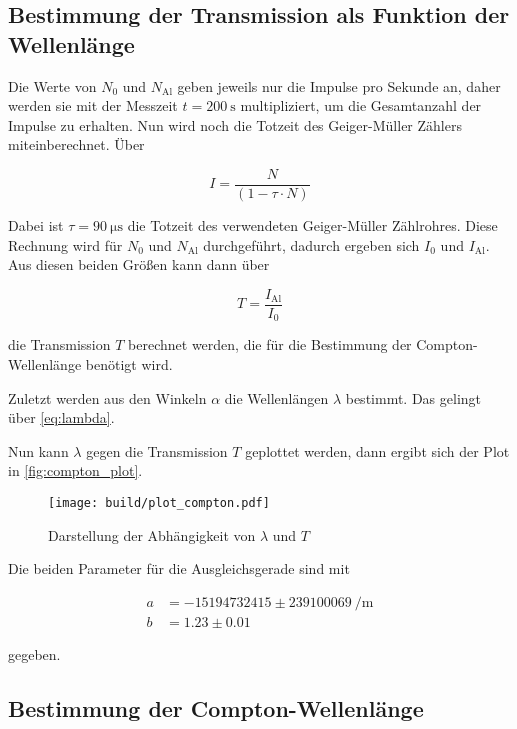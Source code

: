 \subsection{Bestimmung der Transmission als Funktion der Wellenlänge}
\label{ssec:2}

Die Werte von $N_0$ und $N_\text{Al}$ geben jeweils nur die Impulse pro Sekunde an, daher werden sie mit der Messzeit $t = \SI{200}{\second}$ multipliziert, um die Gesamtanzahl der Impulse zu erhalten.
Nun wird noch die Totzeit des Geiger-Müller Zählers miteinberechnet. 
Über 

\begin{equation}
    I = \frac{N}{\left(1 - \tau \cdot N\right)}
    \label{eq:totzeit}
\end{equation}

Dabei ist $\tau = \SI{90}{\micro\second}$ die Totzeit des verwendeten Geiger-Müller Zählrohres.
Diese Rechnung wird für $N_0$ und $N_\text{Al}$ durchgeführt, dadurch ergeben sich $I_0$ und $I_\text{Al}$.
Aus diesen beiden Größen kann dann über 

\begin{equation}
    T = \frac{I_\text{Al}}{I_0}
\end{equation}

die Transmission $T$ berechnet werden, die für die Bestimmung der Compton-Wellenlänge benötigt wird.

Zuletzt werden aus den Winkeln $\alpha$ die Wellenlängen $\lambda$ bestimmt.
Das gelingt über \autoref{eq:lambda}.

Nun kann $\lambda$ gegen die Transmission $T$ geplottet werden, dann ergibt sich der Plot in \autoref{fig:compton_plot}.

\begin{figure}
    \centering
    \texttt{[image: build/plot\_compton.pdf]}
    \caption{Darstellung der Abhängigkeit von $\lambda$ und $T$}
    \label{fig:compton_plot}
\end{figure}

Die beiden Parameter für die Ausgleichsgerade sind mit 

\begin{align}
    a &= -15194732415 \pm \SI{239100069}{\per\meter} \label{eq:parameter1} \\
    b &= 1.23 \pm 0.01 \label{eq:parameter2}  
\end{align}

gegeben.

\subsection{Bestimmung der Compton-Wellenlänge}
\label{ssec:c}

